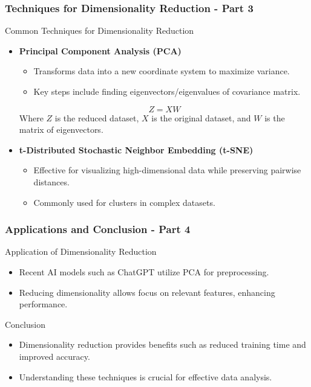 \documentclass[aspectratio=169]{beamer}
\begin{document}
\begin{frame}[fragile]
    \frametitle{Techniques for Dimensionality Reduction - Part 3}
    \begin{block}{Common Techniques for Dimensionality Reduction}
        \begin{itemize}
            \item \textbf{Principal Component Analysis (PCA)}
                \begin{itemize}
                    \item Transforms data into a new coordinate system to maximize variance.
                    \item Key steps include finding eigenvectors/eigenvalues of covariance matrix.
                \end{itemize}
                \begin{equation}
                Z = XW
                \end{equation}
                Where \(Z\) is the reduced dataset, \(X\) is the original dataset, and \(W\) is the matrix of eigenvectors.
            \item \textbf{t-Distributed Stochastic Neighbor Embedding (t-SNE)}
                \begin{itemize}
                    \item Effective for visualizing high-dimensional data while preserving pairwise distances.
                    \item Commonly used for clusters in complex datasets.
                \end{itemize}
        \end{itemize}
    \end{block}
\end{frame}

\begin{frame}[fragile]
    \frametitle{Applications and Conclusion - Part 4}
    \begin{block}{Application of Dimensionality Reduction}
        \begin{itemize}
            \item Recent AI models such as ChatGPT utilize PCA for preprocessing.
            \item Reducing dimensionality allows focus on relevant features, enhancing performance.
        \end{itemize}
    \end{block}

    \begin{block}{Conclusion}
        \begin{itemize}
            \item Dimensionality reduction provides benefits such as reduced training time and improved accuracy.
            \item Understanding these techniques is crucial for effective data analysis.
        \end{itemize}
    \end{block}
\end{frame}
\end{document}
